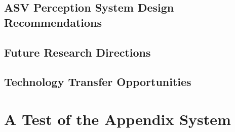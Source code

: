 \documentclass{erauthesis}
\begin{document}
\section{ASV Perception System Design Recommendations}

\section{Future Research Directions}

\section{Technology Transfer Opportunities}




% 


\backmatter

\chapter{A Test of the Appendix System}


\end{document}
